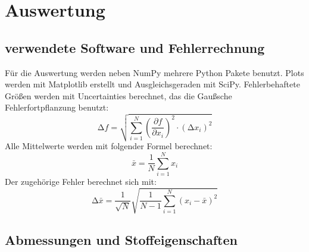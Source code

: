 \section{Auswertung}
\label{sec:Auswertung}

\subsection{verwendete Software und Fehlerrechnung}
\label{sec:SoftwareFehlerrechnung}

Für die Auswertung werden neben NumPy\cite{numpy} mehrere Python Pakete benutzt.
Plots werden mit Matplotlib\cite{matplotlib} erstellt und Ausgleichsgeraden mit SciPy\cite{scipy}.
Fehlerbehaftete Größen werden mit Uncertainties\cite{uncertainties} berechnet, das die Gaußsche Fehlerfortpflanzung benutzt:
\begin{equation*}
    \increment f = \sqrt{\sum_{i=1}^N \left( \frac{\partial f}{\partial x_i} \right)^{2} \cdot (\increment x_i)^{2}}
\end{equation*}
Alle Mittelwerte werden mit folgender Formel berechnet:
\begin{equation*}
  \bar{x} = \frac{1}{N} \sum_{i = 1}^N x_i
\end{equation*}
Der zugehörige Fehler berechnet sich mit:
\begin{equation*}
  \increment \bar{x} = \frac{1}{\sqrt{N}} \sqrt{\frac{1}{N-1} \sum_{i = 1}^N (x_i - \bar{x})^2}
\end{equation*}

\subsection{Abmessungen und Stoffeigenschaften}
\label{sec:Eigenschaften}

